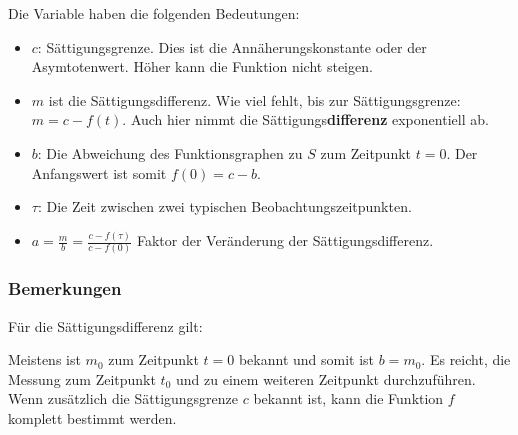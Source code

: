 Die Variable haben die folgenden Bedeutungen:

\begin{itemize}
	\item $c$: Sättigungsgrenze. Dies ist die Annäherungskonstante oder der Asymtotenwert. Höher kann die Funktion nicht steigen.

	\item $m$ ist die
    Sättigungsdifferenz. Wie viel fehlt, bis zur
    Sättigungsgrenze: $m = c - f(t)$. Auch hier nimmt die Sättigungs\textbf{differenz} exponentiell ab.
	\item $b$: Die Abweichung des Funktionsgraphen zu $S$ zum Zeitpunkt $t=0$. Der
    Anfangswert ist somit $f(0) = c - b$.
	\item $\tau$: Die Zeit zwischen zwei typischen
    Beobachtungszeitpunkten.
\item $a=\frac{m}{b}=\frac{c-f(\tau)}{c-f(0)}$ Faktor der Veränderung
  der Sättigungsdifferenz.
\end{itemize}


\subsubsection{Bemerkungen}
\begin{bemerkung}{}{}
  Für die Sättigungsdifferenz gilt:

\end{bemerkung}



\begin{bemerkung}{}{}
Meistens ist $m_0$ zum Zeitpunkt $t=0$ bekannt und somit ist $b=m_0$. Es reicht, die Messung zum Zeitpunkt $t_0$ und zu einem weiteren Zeitpunkt durchzuführen. Wenn zusätzlich die Sättigungsgrenze $c$ bekannt ist, kann die Funktion $f$ komplett bestimmt werden.
\end{bemerkung} 

